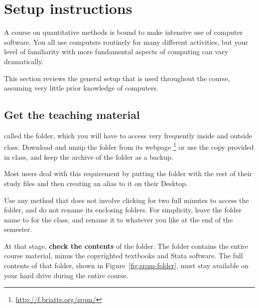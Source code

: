 %
%
\section{Setup instructions}%
	\label{sec:course-setup}%
	
	A course on quantitative methods is bound to make intensive use of computer software. You all use computers routinely for many different activities, but your level of familiarity with more fundamental aspects of computing can vary dramatically.%
	
	This section reviews the general setup that is used throughout the course, assuming very little prior knowledge of computers. %
	
	\subsection{Get the teaching material}%
		\label{sec:teaching-pack}%

	 called the \SRQM folder, which you will have to access very frequently inside and outside class. Download and unzip the folder from its webpage%
		\footnote{\url{http://f.briatte.org/srqm/}} %
		or use the copy provided in class, and keep the \ZIP archive of the folder as a backup.%
		
	 Most users deal with this requirement by putting the \SRQM folder with the rest of their study files and then creating an alias to it on their Desktop.%
	
	Use any method that does not involve clicking for two full minutes to access the \SRQM folder, and do not rename its enclosing folders. For simplicity, leave the folder name to \SRQM for the class, and rename it to whatever you like at the end of the semester.%
	
	At that stage, \textbf{check the contents} of the \SRQM folder. The \SRQM folder contains the entire course material, minus the copyrighted textbooks and Stata software. The full contents of that folder, shown in Figure~\ref{fig:srqm-folder}, must stay available on your hard drive during the entire course.%


